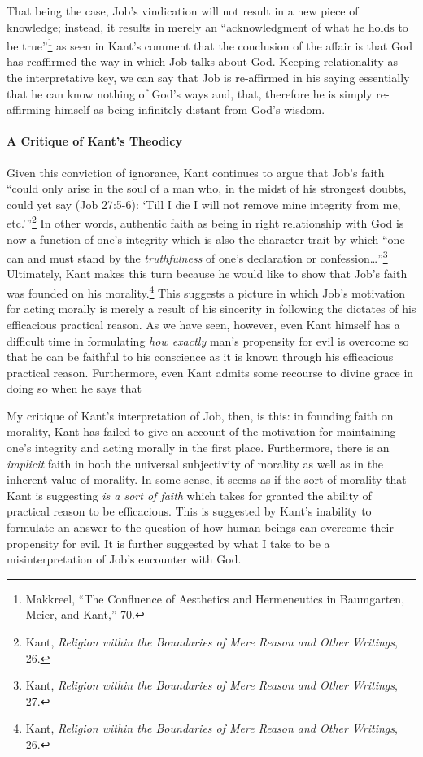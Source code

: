 \documentclass[12pt]{article}
\begin{document}
	That being the case, Job's vindication will not result in a new piece of knowledge; instead, it results in merely an ``acknowledgment of what he holds to be true''\footnote{Makkreel, ``The Confluence of Aesthetics and Hermeneutics in Baumgarten, Meier, and Kant,'' 70.} as seen in Kant's comment that the conclusion of the affair is that God has reaffirmed the way in which Job talks about God. Keeping relationality as the interpretative key, we can say that Job is re-affirmed in his saying essentially that he can know nothing of God's ways and, that, therefore he is simply re-affirming himself as being infinitely distant from God's wisdom. 
	
	\paragraph*{A Critique of Kant's Theodicy} Given this conviction of ignorance, Kant continues to argue that Job's faith ``could only arise in the soul of a man who, in the midst of his strongest doubts, could yet say (Job 27:5-6): `Till I die I will not remove mine integrity from me, etc.'\thinspace''\footnote{Kant, \emph{Religion within the Boundaries of Mere Reason and Other Writings}, 26.} In other words, authentic faith as being in right relationship with God is now a function of one's integrity which is also the character trait by which ``one can and must stand by the \emph{truthfulness} of one's declaration or confession\ldots''\footnote{Kant, \emph{Religion within the Boundaries of Mere Reason and Other Writings}, 27.} Ultimately, Kant makes this turn because he would like to show that Job's faith was founded on his morality.\footnote{Kant, \emph{Religion within the Boundaries of Mere Reason and Other Writings}, 26.} This suggests a picture in which Job's motivation for acting morally is merely a result of his sincerity in following the dictates of his efficacious practical reason. As we have seen, however, even Kant himself has a difficult time in formulating \emph{how exactly} man's propensity for evil is overcome so that he can be faithful to his conscience as it is known through his efficacious practical reason. Furthermore, even Kant admits some recourse to divine grace in doing so when he says that 
	
	My critique of Kant's interpretation of Job, then, is this: in founding faith on morality, Kant has failed to give an account of the motivation for maintaining one's integrity and acting morally in the first place. Furthermore, there is an \emph{implicit} faith in both the universal subjectivity of morality as well as in the inherent value of morality. In some sense, it seems as if the sort of morality that Kant is suggesting \emph{is a sort of faith} which takes for granted the ability of practical reason to be efficacious. This is suggested by Kant's inability to formulate an answer to the question of how human beings can overcome their propensity for evil. It is further suggested by what I take to be a misinterpretation of Job's encounter with God.
	
\end{document}
